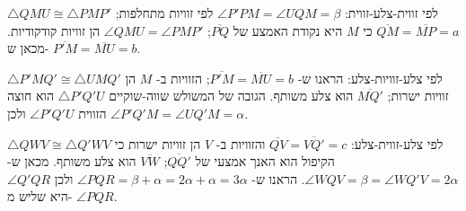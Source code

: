 $\triangle QMU\cong \triangle PMP'$
לפי זווית-צלע-זווית:
$\angle P'PM=\angle UQM=\beta$
לפי זוויות מתחלפות;
$\overline{QM}=\overline{MP}=a$
כי 
$M$
היא נקודת האמצע של
$\overline{PQ}$;
$\angle QMU=\angle PMP'$
הן זוויות קודקודיות. מכאן ש-%
$\overline{P'M}=\overline{MU}=b$.

$\triangle P'MQ'\cong\triangle UMQ'$
לפי צלע-זוויות-צלע: הראנו ש-%
$\overline{P'M}=\overline{MU}=b$;
הזוויות ב-%
$M$
הן זוויות ישרות; 
$\overline{MQ'}$
הוא צלע משותף. הגובה של המשולש שווה-שוקיים 
$\triangle P'Q'U$ 
הוא חוצה הזווית
$\angle P'Q'U$
ולכן
$\angle P'Q'M=\angle UQ'M=\alpha$.


$\triangle QWV\cong\triangle Q'WV$
לפי צלע-זווית-צלע:
$\overline{QV}=\overline{VQ'}=c$
והזוויות ב-%
$V$
הן זוויות ישרות כי הקיפול הוא האנך אמצעי של
$\overline{QQ'}$; $\overline{VW}$
הוא צלע משותף. מכאן ש-%
$\angle WQV=\beta=\angle WQ'V=2\alpha$.
הראנו ש-%
$\angle PQR = \beta + \alpha = 2\alpha+\alpha=3\alpha$
ולכן
$\angle Q'QR$
היא שליש מ-%
$\angle PQR$.
